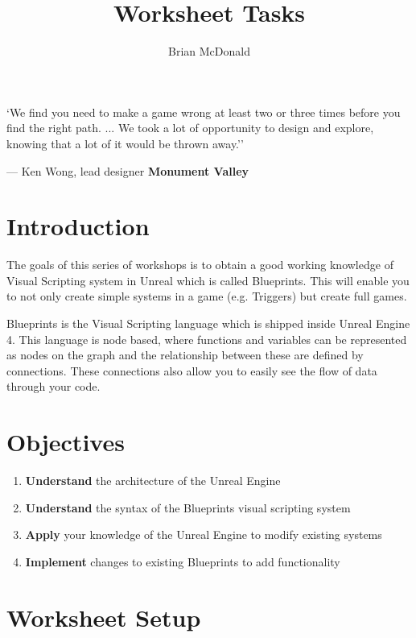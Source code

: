 \documentclass{../../fal_assignment}
\title{Worksheet Tasks}
\author{Brian McDonald} %
\begin{document}
\maketitle 

\begin{marginquote}
`We find you need to make a game wrong at least two or three times before you find the right path. ...
We took a lot of opportunity to design and explore, knowing that a lot of it would be thrown away.''
\par --- Ken Wong, lead designer \textbf{Monument Valley}
\end{marginquote}


\section*{Introduction}
The goals of this series of workshops is to obtain a good working knowledge of Visual Scripting system in Unreal which is called Blueprints. This will enable you to not only create simple systems in a game (e.g. Triggers) but create full games.

Blueprints is the Visual Scripting language which is shipped inside Unreal Engine 4. This language is node based, where functions and variables can be represented as nodes on the graph and the relationship between these are defined by connections. These connections also allow you to easily see the flow of data through your code. 

\section*{Objectives}
\begin{enumerate}[label=(\Alph*)]
	\item \textbf{Understand} the architecture of the Unreal Engine
	\item \textbf{Understand} the syntax of the Blueprints visual scripting system
	\item \textbf{Apply} your knowledge of the Unreal Engine to modify existing systems
	\item \textbf{Implement} changes to existing Blueprints to add functionality
\end{enumerate}

\section*{Worksheet Setup}
\end{document}
